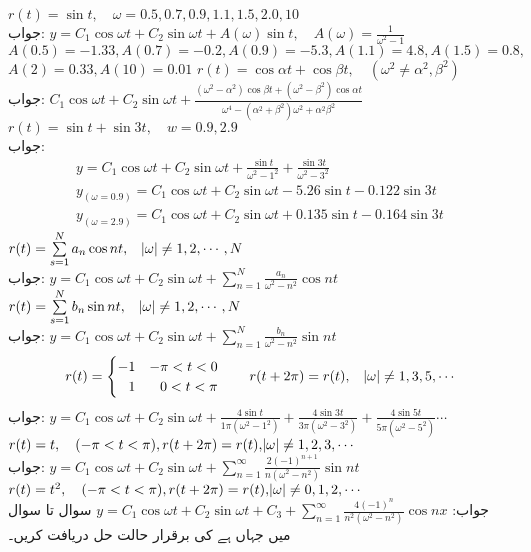 \quad 
$r(t)=\sin t,\quad \omega =0.5,0.7,0.9,1.1,1.5,2.0,10$\\
جواب:\quad
$y=C_1\cos \omega t+C_2\sin \omega t+A(\omega)\sin t,\quad A(\omega)=\tfrac{1}{\omega^2-1}$\\
$A(0.5)=-1.33,A(0.7)=-0.2, A(0.9)=-5.3,A(1.1)=4.8,A(1.5)=0.8,$\\
 $A(2)=0.33, A(10)=0.01$
\quad 
$r(t)=\cos \alpha t+\cos \beta t, \quad (\omega^2 \ne \alpha^2,\beta^2)$\\
جواب:\quad
$C_1\cos \omega t+C_2\sin \omega t+\tfrac{(\omega^2-\alpha^2)\cos \beta t+(\omega^2-\beta^2)\cos \alpha t}{\omega^4-(\alpha^2+\beta^2)\omega^2+\alpha^2\beta^2}$
\quad
$r(t)=\sin t+\sin 3t, \quad w=0.9, 2.9$\\
جواب:\quad
\begin{align*}
y=C_1\cos \omega t+C_2\sin \omega t+\tfrac{\sin t}{\omega^2-1^2}+\tfrac{\sin 3t}{\omega^2-3^2}\\
y_{(\omega=0.9)}=C_1\cos \omega t+C_2\sin \omega t-5.26\sin t-0.122\sin 3t\\
y_{(\omega=2.9)}=C_1\cos \omega t+C_2\sin \omega t+0.135\sin t-0.164\sin 3t
\end{align*}
\quad
$r(t)=\sum\limits_{s=1}^{N} a_n \cos nt,\quad \abs{\omega}\ne 1,2,\cdots,N$\\
جواب:\quad
$y=C_1\cos \omega t+C_2\sin \omega t+\sum\limits_{n=1}^{N} \frac{a_n}{\omega^2-n^2}\cos nt$
\quad
$r(t)=\sum\limits_{s=1}^{N} b_n \sin nt,\quad \abs{\omega}\ne 1,2,\cdots,N$\\
جواب:\quad
$y=C_1\cos \omega t+C_2\sin \omega t+\sum\limits_{n=1}^{N} \frac{b_n}{\omega^2-n^2}\sin nt$
\quad
\begin{align*}
r(t)=
\begin{cases}
-1&-\pi<t<0\\
\phantom{-}1&\phantom{-}0<t<\pi
\end{cases}
\quad\quad r(t+2\pi)=r(t), \quad \abs{\omega}\ne 1,3,5,\cdots
\end{align*}
جواب:\quad
$y=C_1\cos \omega t+C_2\sin \omega t+\tfrac{4\sin t}{1\pi(\omega^2-1^2)}+\tfrac{4\sin 3t}{3\pi(\omega^2-3^2)}+\tfrac{4\sin 5t}{5\pi(\omega^2-5^2)}\cdots$
\quad 
$r(t)=t,\quad (-\pi<t<\pi), r(t+2\pi)=r(t),\abs{\omega}\ne 1,2,3,\cdots$\\
جواب:\quad
$y=C_1\cos \omega t+C_2\sin \omega t+\sum\limits_{n=1}^{\infty} \tfrac{2(-1)^{n+1}}{n(\omega^2-n^2)}\sin nt$
\quad 
$r(t)=t^2,\quad (-\pi<t<\pi), r(t+2\pi)=r(t),\abs{\omega}\ne 0, 1,2,\cdots$\\
جواب:\quad
$y=C_1\cos \omega t+C_2\sin \omega t+C_3+\sum\limits_{n=1}^{\infty}\tfrac{4(-1)^n}{n^2(\omega^2-n^2)}\cos nx$
سوال  تا سوال  میں  جہاں  ہے کی برقرار حالت حل دریافت کریں۔

